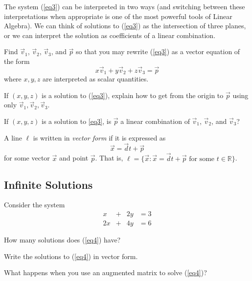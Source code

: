 \documentclass[14pt]{problemset}
\newcommand{\R}{\mathbb{R}}
\begin{document}
	The system (\ref{eq3}) can be interpreted in two ways (and switching between these 
	interpretations when appropriate is one of the most powerful tools of Linear 
	Algebra).  We can think of solutions to (\ref{eq3})
	as the intersection of three planes, or we can interpret the solution
	as coefficients of a linear combination.

	\begin{parts}[resume]
		\item Find $\vec v_1$, $\vec v_2$, $\vec v_3$, and $\vec p$ 
			so that you may rewrite (\ref{eq3}) as a vector equation of the form
		\[
			x\vec v_1+y\vec v_2+z\vec v_3 = \vec p
		\]
		where $x,y,z$ are interpreted as scalar quantities.

		\item If $(x,y,z)$ is a solution to (\ref{eq3}), explain how to get from the
		origin to $\vec p$ using only $\vec v_1, \vec v_2, \vec v_3$.
		\item If $(x,y,z)$ is a solution to \eqref{eq3}, is $\vec p$ a linear combination of $\vec v_1$,
			$\vec v_2$, and $\vec v_3$?
	\end{parts}
	
	\begin{definition}
		A line $\ell$ is written in \emph{vector form} if it is expressed
		as
		\[
			\vec x=\vec d t+\vec p
		\]
		for some vector $\vec x$ and point $\vec p$. That is, $\ell = \{\vec x: \vec x=
		\vec d t+\vec p\text{ for some } t\in\R \}$.
	\end{definition}

\subsection*{Infinite Solutions}
	\question
	Consider the system
	\begin{equation}\label{eq4}
		\begin{array}{rcrl}
			x&+&2y &= 3\\
			2x&+&4y &= 6
		\end{array}
	\end{equation}

	\begin{parts}
		\item How many solutions does (\ref{eq4}) have?
		\item Write the solutions to (\ref{eq4}) in vector form.
		\item What happens when you use an augmented matrix
		to solve (\ref{eq4})?
	\end{parts}
\end{document}
